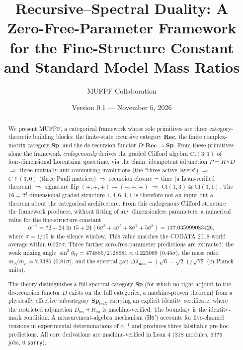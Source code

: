 \documentclass[11pt,twoside]{article}
\title{Recursive--Spectral Duality: A Zero-Free-Parameter Framework for the Fine-Structure Constant and Standard Model Mass Ratios}
\author{MUFPF Collaboration}
\date{Version 0.1 --- November 6, 2026}
\newcommand{\rec}{\mathbf{Rec}}
\newcommand{\spc}{\mathbf{Sp}}
\newcommand{\spimd}{\mathbf{Sp}_{\mathrm{Im}D}}
\newcommand{\DF}{\ensuremath{D}}
\newcommand{\RF}{\ensuremath{R}}
\newcommand{\DIm}{\ensuremath{D_{\mathrm{im}}}}
\newcommand{\RIm}{\ensuremath{R_{\mathrm{im}}}}
\begin{document}
\maketitle

\begin{abstract}
We present MUFPF, a categorical framework whose sole primitives are three category-theoretic building blocks: the finite-state recursive category $\rec$, the finite complex-matrix category $\spc$, and the de-recursion functor $\DF : \rec \to \spc$. From these primitives alone the framework \emph{endogenously} derives the graded Clifford algebra $\mathrm{Cl}(3,1)$ of four-dimensional Lorentzian spacetime, via the chain: idempotent adjunction $P = \RF \circ \DF$ $\Rightarrow$ three mutually anti-commuting involutions (the "three active layers") $\Rightarrow$ $C\ell(3,0)$ (three Pauli matrices) $\Rightarrow$ recursion closure = time (a Lean-verified theorem) $\Rightarrow$ signature flip $(+,+,+) \mapsto (-,+,+)$ $\Rightarrow$ $\mathrm{Cl}(1,3) \cong \mathrm{Cl}(3,1)$. The $16 = 2^4$-dimensional graded structure $1,4,6,4,1$ is therefore not an input but a theorem about the categorical architecture. From this endogenous Clifford structure the framework produces, without fitting of any dimensionless parameters, a numerical value for the fine-structure constant
\[
\alpha^{-1} = 72 + 24\ln 15 + 24(6\sigma^3 + 4\sigma^5 + 8\sigma^7 + 5\sigma^8) = 137.035999083426,
\]
where $\sigma = 1/15$ is the silence window. This value matches the CODATA 2018 world average within $0.027\sigma$. Three further zero-free-parameter predictions are extracted: the weak mixing angle $\sin^2\theta_W = 474885/2128681 \approx 0.223089$ ($0.45\sigma$), the mass ratio $m_\rho/m_\mu \approx 7.3386$ ($0.81\sigma$), and the spectral gap $\Delta\lambda_{\min} = (\sqrt{6}-\sqrt{2})/\sqrt{72}$ (in Planck units).

The theory distinguishes a full spectral category $\spc$ (for which no right adjoint to the de-recursion functor $\DF$ exists on the full categories, a machine-proven theorem) from a physically effective subcategory $\spimd$ carrying an explicit identity certificate, where the restricted adjunction $\DIm \dashv \RIm$ is machine-verified. The boundary is the identity-mark condition. A measurement-algebra mechanism (H6') accounts for five-channel tensions in experimental determinations of $\alpha^{-1}$ and produces three falsifiable pre-hoc predictions. All core derivations are machine-verified in Lean 4 ($318$ modules, $6376$ jobs, $0$ \texttt{sorry}).
\end{abstract}
\end{document}
